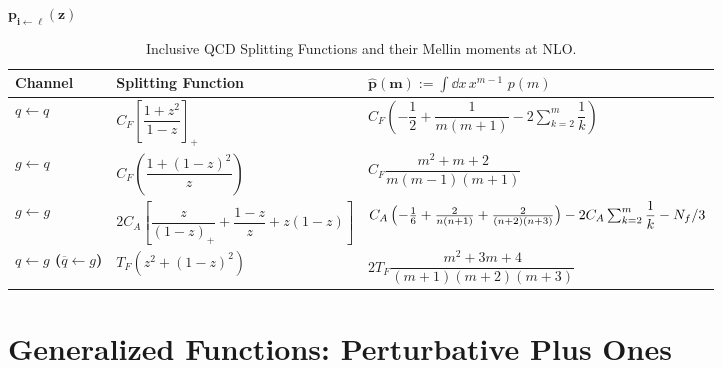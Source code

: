 \begin{subappendices}
\vspace{1em}
\begin{table}[h!]
\begin{center}
\LARGE $\boldsymbol{p_{i \leftarrow \ell}(z)}$
\end{center}
\vspace{-10pt}
\centering
\caption[Inclusive NLO QCD splitting functions and their Mellin moments.]{
    Inclusive QCD Splitting Functions and their Mellin moments at NLO.  
}
\label{tab:inclusive-splitting}
\vspace{5pt}
\renewcommand{\arraystretch}{3.5}
\begin{tabular}{|>{\bfseries}m{1.5cm}|m{6cm}|m{6cm}|}
\hline
\centering \textbf{Channel} & \centering \textbf{Splitting Function} & \centering $\boldsymbol{\hat{p}(m)} := \int \dd x\, x^{m-1} \, \, p(m)$
\tabularnewline
\hline
\centering $q \leftarrow q$
                            &
\centering $C_F \left[ \dfrac{1 + z^2}{1 - z} \right]_+$
                            &
\centering $C_F \left(-\dfrac{1}{2} + \dfrac{1}{m(m+1)} - 2\sum_{k=2}^{m} \dfrac{1}{k} \right)$
\tabularnewline
\hline
\centering $g \leftarrow q$
                            &
\centering $C_F \left( \dfrac{1 + (1 - z)^2}{z} \right)$
                            &
\centering
$C_F \dfrac{m^2 + m + 2}{m(m-1)(m+1)}$
\tabularnewline
\hline
\centering $g \leftarrow g$
                            &
\centering $2C_A \left[ \dfrac{z}{(1 - z)_+} + \dfrac{1 - z}{z} + z(1 - z) \right]$
                            &
\centering
$C_A\left(-\frac{1}{6} + \frac{2}{n(n+1)} + \frac{2}{(n+2)(n+3)}\right) - 2C_A \sum_{k=2}^{m} \dfrac{1}{k} - N_f / 3$
\tabularnewline
\hline
\centering
$q \leftarrow g$
($\overline{q} \leftarrow g$)
                            &
\centering $T_F \left( z^2 + (1 - z)^2 \right)$
                            &
\centering
$2T_F \dfrac{m^2+3m+4}{(m+1)(m+2)(m+3)}$
\tabularnewline
\hline
\end{tabular}
\end{table}





\section{Generalized Functions: Perturbative Plus Ones}
\label{app:plus-functions}


\end{subappendices}
